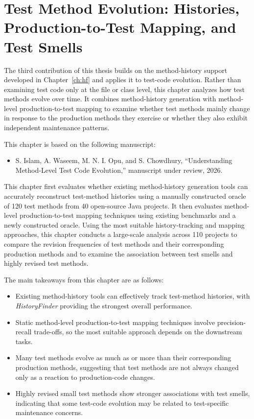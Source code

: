 \chapter{Test Method Evolution: Histories, Production-to-Test Mapping, and Test Smells}
\label{ch:t2p}

The third contribution of this thesis builds on the method-history support developed in Chapter~\ref{ch:hf} and applies it to test-code evolution. Rather than examining test code only at the file or class level, this chapter analyzes how test methods evolve over time. It combines method-history generation with method-level production-to-test mapping to examine whether test methods mainly change in response to the production methods they exercise or whether they also exhibit independent maintenance patterns.

This chapter is based on the following manuscript:
\begin{itemize}
\item S. Islam, A. Waseem, M. N. I. Opu, and S. Chowdhury, ``Understanding Method-Level Test Code Evolution,'' manuscript under review, 2026.
\end{itemize}

This chapter first evaluates whether existing method-history generation tools can accurately reconstruct test-method histories using a manually constructed oracle of 120 test methods from 40 open-source Java projects. It then evaluates method-level production-to-test mapping techniques using existing benchmarks and a newly constructed oracle. Using the most suitable history-tracking and mapping approaches, this chapter conducts a large-scale analysis across 110 projects to compare the revision frequencies of test methods and their corresponding production methods and to examine the association between test smells and highly revised test methods.

The main takeaways from this chapter are as follows:
\begin{itemize}
\item Existing method-history tools can effectively track test-method histories, with \emph{HistoryFinder} providing the strongest overall performance.
\item Static method-level production-to-test mapping techniques involve precision-recall trade-offs, so the most suitable approach depends on the downstream tasks.
\item Many test methods evolve as much as or more than their corresponding production methods, suggesting that test methods are not always changed only as a reaction to production-code changes.
\item Highly revised small test methods show stronger associations with test smells, indicating that some test-code evolution may be related to test-specific maintenance concerns.
\end{itemize}

